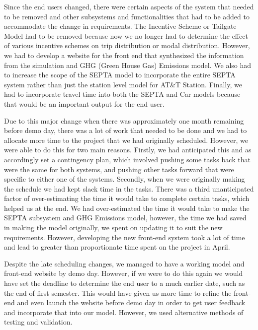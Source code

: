 Since the end users changed, there were certain aspects of the system
that needed to be removed and other subsystems and functionalities
that had to be added to accommodate the change in requirements. The
Incentive Scheme or Tailgate Model had to be removed because now we no
longer had to determine the effect of various incentive schemes on
trip distribution or modal distribution. However, we had to develop a
website for the front end that synthesized the information from the
simulation and GHG (Green House Gas) Emissions model. We also had to
increase the scope of the SEPTA model to incorporate the entire SEPTA
system rather than just the station level model for AT\&T
Station. Finally, we had to incorporate travel time into both the
SEPTA and Car models because that would be an important output for the
end user.

Due to this major change when there was approximately one month
remaining before demo day, there was a lot of work that needed to be
done and we had to allocate more time to the project that we had
originally scheduled. However, we were able to do this for two main
reasons. Firstly, we had anticipated this and as accordingly set a
contingency plan, which involved pushing some tasks back that were the
same for both systems, and pushing other tasks forward that were
specific to either one of the systems. Secondly, when we were
originally making the schedule we had kept slack time in the
tasks. There was a third unanticipated factor of over-estimating the
time it would take to complete certain tasks, which helped us at the
end. We had over-estimated the time it would take to make the SEPTA
subsystem and GHG Emissions model, however, the time we had saved in
making the model originally, we spent on updating it to suit the new
requirements. However, developing the new front-end system took a lot
of time and lead to greater than proportionate time spent on the
project in April.

Despite the late scheduling changes, we managed to have a working
model and front-end website by demo day. However, if we were to do
this again we would have set the deadline to determine the end user to
a much earlier date, such as the end of first semester. This would
have given us more time to refine the front-end and even launch the
website before demo day in order to get user feedback and incorporate
that into our model. However, we used alternative methods of testing
and validation.

